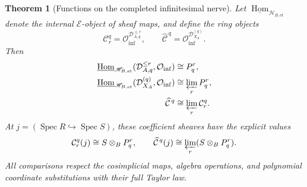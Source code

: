 \documentclass[11pt,a4paper]{article}
\numberwithin{algorithm}{section}
\numberwithin{equation}{section}
\newtheorem{theorem}{Theorem}[section]
\theoremstyle{definition}
\theoremstyle{remark}
\theoremstyle{plain}
\newcommand{\E}{\mathcal E}
\newcommand{\Hom}{\operatorname{Hom}}
\newcommand{\ThickEt}{\mathscr H_{B,\mathrm{et}}}
\theoremstyle{definition}
\theoremstyle{plain}
\begin{document}
\begin{theorem}[Functions on the completed infinitesimal nerve]
\label{thm:primary-synthetic-cochains}
Let $\underline{\Hom}_{\ThickEt}$ denote the internal $\E$-object
of sheaf maps, and define the ring objects
\[
 \mathcal C_r^q=\mathcal O_{\mathrm{inf}}^{\mathcal D_{A,q}^{\le r}},
 \qquad
 \widehat{\mathcal C}^{\,q}
       =\mathcal O_{\mathrm{inf}}^{\mathcal D_{X_A}^{(q)}}.
\]
Then
\begin{align}
 \underline{\Hom}_{\ThickEt}
   (\mathcal D_{A,q}^{\le r},\mathcal O_{\mathrm{inf}})
   &\cong P_q^r,\label{eq:primary-finite-functions}\\
 \underline{\Hom}_{\ThickEt}
   (\mathcal D_{X_A}^{(q)},\mathcal O_{\mathrm{inf}})
   &\cong\varprojlim_rP_q^r,\label{eq:primary-formal-functions}\\
 \widehat{\mathcal C}^{\,q}&\cong\varprojlim_r\mathcal C_r^q.
 \label{eq:primary-complete-coefficient-sheaf}
\end{align}
At $j=(\operatorname{Spec}R\hookrightarrow\operatorname{Spec}S)$,
these coefficient sheaves have the explicit values
\[
 \mathcal C_r^q(j)\cong S\otimes_BP_q^r,\qquad
 \widehat{\mathcal C}^{\,q}(j)
       \cong\varprojlim_r(S\otimes_BP_q^r).
\]
All comparisons respect the cosimplicial maps, algebra operations,
and polynomial coordinate substitutions with their full Taylor law.
\end{theorem}
\end{document}
